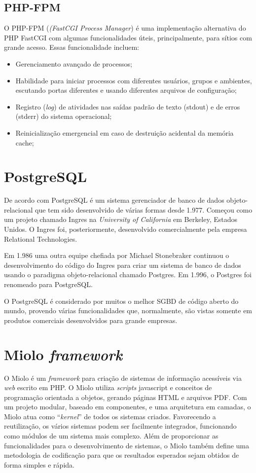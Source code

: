 \subsection{PHP-FPM}
O PHP-FPM (\textit{(FastCGI Process Manager}) é uma implementação alternativa do PHP FastCGI com algumas funcionalidades úteis, principalmente, para sítios com grande acesso. Essas funcionalidade incluem:

\begin{itemize}
	\item Gerenciamento avançado de processos;
	\item Habilidade para iniciar processos com diferentes usuários, grupos e ambientes, escutando portas diferentes e usando diferentes arquivos de configuração;
	\item Registro (\textit{log}) de atividades nas saídas padrão de texto 
	(stdout) e de erros (stderr) do sistema operacional;
	\item Reinicialização emergencial em caso de destruição acidental da memória cache;
\end{itemize}

\section{PostgreSQL}

De acordo com  PostgreSQL é um sistema gerenciador de 
banco de dados objeto-relacional que tem sido desenvolvido de várias formas 
desde 1.977. Começou como um projeto chamado Ingres na \textit{University of 
California} em Berkeley, Estados Unidos. O Ingres foi, posteriormente, 
desenvolvido comercialmente pela empresa Relational Technologies.

Em 1.986 uma outra equipe chefiada por Michael Stonebraker continuou o 
desenvolvimento do código do Ingres para criar um sistema de banco de dados 
usando o paradigma objeto-relacional chamado Postgres. Em 1.996, o Postgres foi 
renomeado para PostgreSQL.

O PostgreSQL é considerado por muitos o melhor SGBD de código aberto do mundo, 
provendo várias funcionalidades que, normalmente, são vistas somente em 
produtos comerciais desenvolvidos para grande empresas.

\section{Miolo \textit{framework}}

O Miolo é um \textit{framework} para criação de sistemas de informação 
acessíveis via \textit{web} escrito em PHP. O Miolo utiliza \textit{scripts} 
javascript e conceitos de programação orientada a objetos, gerando páginas HTML 
e arquivos PDF. Com um projeto modular, baseado em componentes, e uma 
arquitetura em camadas, o Miolo atua como ``\textit{kernel}'' de todos os 
sistemas criados. Favorecendo a reutilização, os vários sistemas podem ser 
facilmente integrados, funcionando como módulos de um sistema mais complexo. 
Além de proporcionar as funcionalidades para o desenvolvimento de sistemas, o 
Miolo também define uma metodologia de codificação para que os resultados 
esperados sejam obtidos de forma simples e rápida.

